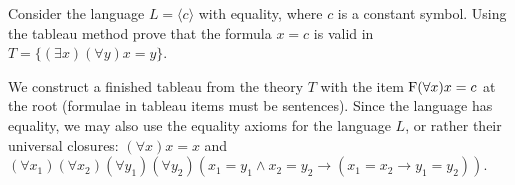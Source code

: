 \begin{problem}

    Consider the language $L=\langle c\rangle$ with equality, where $c$ is a constant symbol. Using the tableau method prove that the formula $x=c$ is valid in $T=\{(\exists x)(\forall y)x=y\}$.

    \begin{solution}

        We construct a finished tableau from the theory $T$ with the item $\mathrm{F}(\forall x)x=c$ at the root (formulae in tableau items must be sentences). Since the language has equality, we may also use the equality axioms for the language $L$, or rather their universal closures: $(\forall x)x=x$ and $(\forall x_1)(\forall x_2)(\forall y_1)(\forall y_2)(x_1=y_1\wedge x_2=y_2\to (x_1=x_2\to y_1=y_2))$.


\end{solution}
\end{problem}
